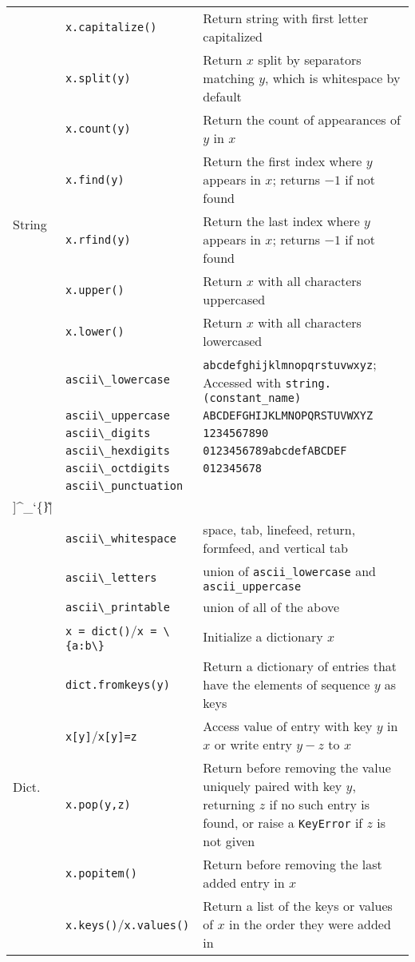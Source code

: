 \documentclass{article}
\begin{document}
\begin{center}
\begin{tabularx}{\textwidth}{llX}
\multirow{10}{*}{String} & \lstinline|x.capitalize()| & Return string with first letter capitalized\\
& \lstinline|x.split(y)| & Return \(x\) split by separators matching \(y\), which is whitespace by default\\
& \lstinline|x.count(y)| & Return the count of appearances of \(y\) in \(x\)\\
& \lstinline|x.find(y)| & Return the first index where \(y\) appears in \(x\); returns \(-1\) if not found\\
& \lstinline|x.rfind(y)| & Return the last index where \(y\) appears in \(x\); returns \(-1\) if not found\\
& \lstinline|x.upper()| & Return \(x\) with all characters uppercased\\
& \lstinline|x.lower()| & Return \(x\) with all characters lowercased\\\midrule

\multirow{9}{*}{(Const.)} & \lstinline+ascii\_lowercase+ & \lstinline|abcdefghijklmnopqrstuvwxyz|; Accessed with \lstinline|string.(constant_name)|\\
& \lstinline+ascii\_uppercase+ & \lstinline|ABCDEFGHIJKLMNOPQRSTUVWXYZ|\\
& \lstinline+ascii\_digits+ & \lstinline|1234567890|\\
& \lstinline+ascii\_hexdigits+ & \lstinline|0123456789abcdefABCDEF| \\
& \lstinline+ascii\_octdigits+ & \lstinline|012345678|\\
& \lstinline+ascii\_punctuation+ & \lstinline|!"#\$\%\&'()*+,-./:;<=>?@\[\\]^\_`\{\|\}\~|\\
& \lstinline+ascii\_whitespace+ & space, tab, linefeed, return, formfeed, and vertical tab\\
& \lstinline+ascii\_letters+ & union of \lstinline|ascii_lowercase| and \lstinline|ascii_uppercase|\\
& \lstinline+ascii\_printable+ & union of all of the above\\\midrule

\multirow{7}{*}[-0.5em]{Dict.} & \lstinline|x = dict()|/\lstinline|x = \{a:b\}| & Initialize a dictionary \(x\) \\ 
& \lstinline|dict.fromkeys(y)| & Return a dictionary of entries that have the elements of sequence \(y\) as keys\\ %
& \lstinline|x[y]|/\lstinline|x[y]=z| & Access value of entry with key \(y\) in \(x\) or write entry \(y-z\) to \(x\)\\
& \lstinline|x.pop(y,z)| & Return before removing the value uniquely paired with key \(y\), returning \(z\) if no such entry is found, or raise a \lstinline|KeyError| if \(z\) is not given\\
& \lstinline|x.popitem()| & Return before removing the last added entry in \(x\)\\
& \lstinline|x.keys()|/\lstinline|x.values()| & Return a list of the keys or values of \(x\) in the order they were added in\\\midrule


\end{tabularx}
\end{center}
\end{document}
